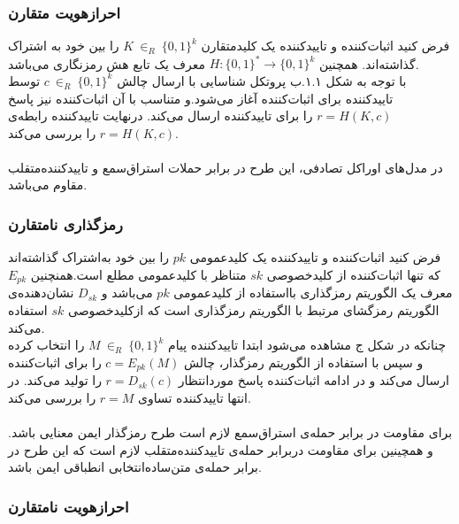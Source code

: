 \subsubsection{احرازهویت متقارن }\label{symmetric_authectication}

فرض کنید اثبات‌کننده و تاییدکننده یک کلیدمتقارن
$K~ {\in}_R ~ \{0,1\}^k$
را بین خود به اشتراک گذاشته‌اند. همچنین 
$H : \{0,1\}^* \rightarrow \{0,1\}^k$
معرف یک تابع هش رمزنگاری می‌باشد.
\\
با توجه به شکل ۱.۱.ب 
پروتکل شناسایی با ارسال چالش
$c ~ {\in}_R ~ \{0,1\}^k$
توسط تاییدکننده برای اثبات‌کننده آغاز می‌شود.و متناسب با آن اثبات‌کننده نیز پاسخ
$r = H(K,c)$
را برای تاییدکننده ارسال می‌کند. درنهایت تاییدکننده رابطه‌ی
$r = H(K,c)$
را بررسی می‌کند.
\\
\\
در مدل‌های اوراکل تصادفی، این طرح در برابر حملات استراق‌سمع و تاییدکننده‌متقلب مقاوم می‌باشد. 

\subsubsection{رمزگذاری نامتقارن }\label{asymmetric_enccryption}

فرض کنید اثبات‌کننده و تاییدکننده یک کلیدعمومی
$pk$
را بین خود به‌اشتراک گذاشته‌اند که تنها اثبات‌کننده از کلیدخصوصی 
$sk$
متناظر با کلیدعمومی مطلع است.همنچنین 
$E_{pk}$
معرف یک الگوریتم رمزگذاری بااستفاده از کلیدعمومی
$pk$
می‌باشد و 
$D_{sk}$
نشان‌دهنده‌ی الگوریتم رمزگشای مرتبط با الگوریتم رمزگذاری است که ازکلیدخصوصی
$sk$
استفاده می‌کند.
\\
چنانکه در شکل ج مشاهده می‌شود ابتدا تاییدکننده پیام
$M ~ {\in}_R ~ \{0,1\}^k$
را انتخاب کرده و سپس با استفاده از الگوریتم رمزگذار، چالش
$c = E_{pk}(M)$
را برای اثبات‌کننده ارسال می‌کند و در ادامه اثبات‌کننده پاسخ موردانتظار
$r = D_{sk}(c)$
را تولید می‌کند. در انتها تاییدکننده تساوی
$r = M$
را بررسی می‌کند.
\\
\\
برای مقاومت در برابر حمله‌ی استراق‌سمع لازم است طرح رمزگذار ایمن معنایی باشد. و همچینین برای مقاومت دربرابر حمله‌ی تاییدکننده‌متقلب لازم است که این طرح در برابر حمله‌ی متن‌ساده‌انتخابی انطباقی ایمن باشد.

\subsubsection{احرازهویت نامتقارن}\label{asymmetric_authentication}

